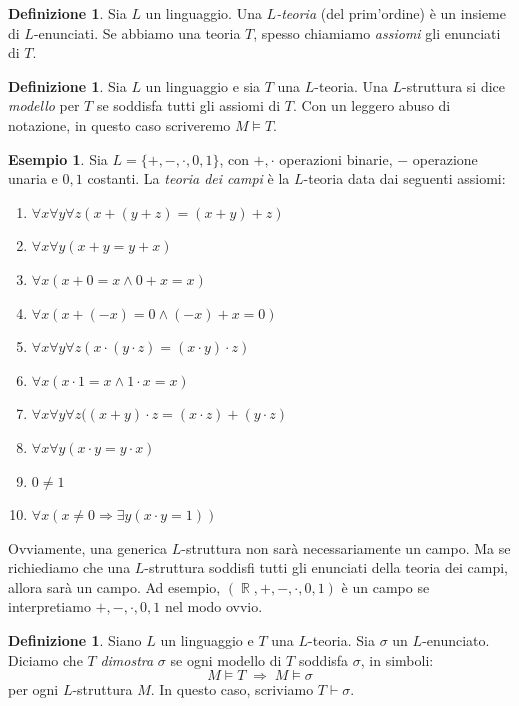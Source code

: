 \documentclass[12pt,a4paper]{report}
\theoremstyle{definition}
\newtheorem{defn}[teo]{Definizione}  %
\newtheorem{es}[teo]{Esempio}  %
\theoremstyle{num.custom-title}
\DeclareMathOperator{\R}{\mathbb{R}}
\DeclareMathOperator{\imp}{\Rightarrow}
\begin{document}
\begin{defn}
Sia $L$ un linguaggio. Una $L$\emph{-teoria} (del prim'ordine) è un insieme di $L$-enunciati. Se abbiamo una teoria $T$, spesso chiamiamo \emph{assiomi} gli enunciati di $T$.
\end{defn}

\begin{defn}
Sia $L$ un linguaggio e sia $T$ una $L$-teoria. Una $L$-struttura si dice \emph{modello} per $T$ se soddisfa tutti gli assiomi di $T$. Con un leggero abuso di notazione, in questo caso scriveremo $M \models T$.
\end{defn}

\begin{es}
Sia $L=\{+,-,\cdot,0,1\}$, con $+,\cdot$ operazioni binarie, $-$ operazione unaria e $0,1$ costanti. La \emph{teoria dei campi} è la $L$-teoria data dai seguenti assiomi:
\begin{enumerate}
\item $\forall x \forall y \forall z (x + (y + z)=(x + y) + z)$
\item $\forall x \forall y (x+y=y+x)$
\item $\forall x (x + 0= x \wedge 0 + x = x)$
\item $\forall x (x + (-x) =0 \wedge (-x) + x =0)$
\item $\forall x \forall y \forall z (x \cdot (y \cdot z)=(x \cdot y) \cdot z)$
\item $\forall x (x \cdot 1= x \wedge 1 \cdot x = x)$
\item $\forall x \forall y \forall z ((x+y) \cdot z = (x \cdot z) + (y \cdot z)$
\item $\forall x \forall y (x \cdot y = y \cdot x)$
\item $0 \neq 1$
\item $\forall x (x \neq 0 \imp \exists y (x \cdot y =1))$
\end{enumerate}
Ovviamente, una generica $L$-struttura non sarà necessariamente un campo. Ma se richiediamo che una $L$-struttura soddisfi tutti gli enunciati della teoria dei campi, allora sarà un campo. Ad esempio, $(\R,+,-,\cdot,0,1)$ è un campo se interpretiamo $+,-,\cdot,0,1$ nel modo ovvio.
\end{es}

\begin{defn}
Siano $L$ un linguaggio e $T$ una $L$-teoria. Sia $\sigma$ un $L$-enunciato. Diciamo che $T$ \emph{dimostra} $\sigma$ se ogni modello di $T$ soddisfa $\sigma$, in simboli:
\[
M \models T \; \imp \; M \models \sigma
\]
per ogni $L$-struttura $M$. In questo caso, scriviamo $T \vdash \sigma$.
\end{defn}
\end{document}
